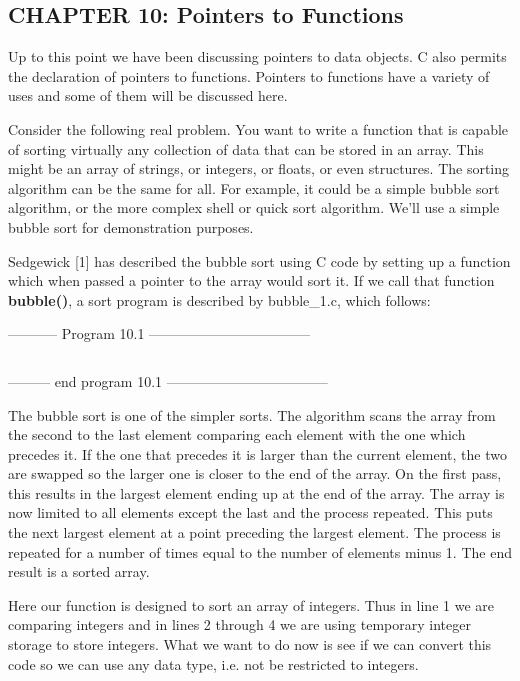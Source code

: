 \hypertarget{chapter-10-pointers-to-functions}{%
\subsection{CHAPTER 10: Pointers to
Functions}\label{chapter-10-pointers-to-functions}}

Up to this point we have been discussing pointers to data objects. C
also permits the declaration of pointers to functions. Pointers to
functions have a variety of uses and some of them will be discussed
here.

Consider the following real problem. You want to write a function that
is capable of sorting virtually any collection of data that can be
stored in an array. This might be an array of strings, or integers, or
floats, or even structures. The sorting algorithm can be the same for
all. For example, it could be a simple bubble sort algorithm, or the
more complex shell or quick sort algorithm. We'll use a simple bubble
sort for demonstration purposes.

Sedgewick {[}1{]} has described the bubble sort using C code by setting
up a function which when passed a pointer to the array would sort it. If
we call that function \textbf{bubble()}, a sort program is described by
bubble\_1.c, which follows:

-----------  Program 10.1  -----------------------------------
\inputminted{c}{../src/ch10-1.c}
--------- end program 10.1 -----------------------------------

The bubble sort is one of the simpler sorts. The algorithm scans the
array from the second to the last element comparing each element with
the one which precedes it. If the one that precedes it is larger than
the current element, the two are swapped so the larger one is closer to
the end of the array. On the first pass, this results in the largest
element ending up at the end of the array. The array is now limited to
all elements except the last and the process repeated. This puts the
next largest element at a point preceding the largest element. The
process is repeated for a number of times equal to the number of
elements minus 1. The end result is a sorted array.

Here our function is designed to sort an array of integers. Thus in line
1 we are comparing integers and in lines 2 through 4 we are using
temporary integer storage to store integers. What we want to do now is
see if we can convert this code so we can use any data type, i.e. not be
restricted to integers.

